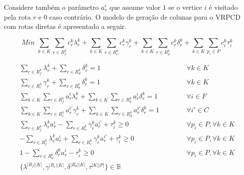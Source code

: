 \documentclass[12pt]{article}
\begin{document}
\noindent Considere tamb\'em o par\^ametro $a^i_r$ que assume valor $1$ se o vertice $i$ \'e visitado pela rota $r$ e $0$ caso contr\'ario. O modelo de gera\c{c}\~ao de colunas para o VRPCD com rotas diretas \'e apresentado a seguir.

\[
Min \,\, \sum\limits_{k \in K}{ \sum\limits_{r \in R_f^k} {c_r^k \lambda^k_r}} + \sum\limits_{k \in K}{ \sum\limits_{r \in R_c^k} {c_r^k \gamma^k_r}} + \sum\limits_{k \in K}{ \sum\limits_{r \in R_d^k} {c_r^k \delta^k_r}} + \sum\limits_{k \in K} {\sum\limits_{p_i \in P} {c^k_i \tau^k_i}}
\]

\begin{eqnarray}
\label{eqA01}
  \sum\limits_{r \in R_f^k} {\lambda^k_r} + \sum\limits_{r \in R_d^k} {\delta^k_r} = 1  & \hspace{1cm} & \forall k \in K \\
\label{eqA02}
  \sum\limits_{r \in R_c^k} {\gamma^k_r} + \sum\limits_{r \in R_d^k} {\delta^k_r} = 1 & \hspace{1cm} & \forall k \in K \\
\label{eqA03}
  \sum\limits_{k \in K}{ \sum\limits_{r \in R_f^k} {a^i_r \lambda^k_r}} + \sum\limits_{k \in K}{ \sum\limits_{r \in R_d^k} {a^i_r \delta^k_r}} = 1 & \hspace{1cm} & \forall i \in F \\
\label{eqA04}
  \sum\limits_{k \in K}{ \sum\limits_{r \in R_c^k} {a^{i'}_r \gamma^k_r}} + \sum\limits_{k \in K}{ \sum\limits_{r \in R_d^k} {a^{i'}_r \delta^k_r}} = 1 & \hspace{1cm} & \forall i' \in C \\
\label{eqA05}
  \sum\limits_{r \in R_f^k} {\lambda^k_r a^i_r} - \sum\limits_{r \in R_c^k} {\gamma^k_r a^{i'}_r} + \tau^k_i \ge 0 & \hspace{1cm} & \forall p_i \in P, \forall k \in K \\
\label{eqA06}
  -\sum\limits_{r \in R_f^k} {\lambda^k_r a^i_r} + \sum\limits_{r \in R_c^k} {\gamma^k_r a^{i'}_r} + \tau^k_i \ge 0 & \hspace{1cm} & \forall p_i \in P, \forall k \in K \\
\label{eqA07}
  1 - \sum\limits_{r \in R_d^k} {\delta^k_r a^i_r} - \tau^k_i \ge 0 & \hspace{1cm} & \forall p_i \in P, \forall k \in K \\
\label{eqA07}
  \{\lambda^{|R_f||K|}, \gamma^{|R_c||K|}, \delta^{|R_d||K|}, \tau^{|K||P|}\} \in \mathbb{B}
\end{eqnarray}
\end{document}
